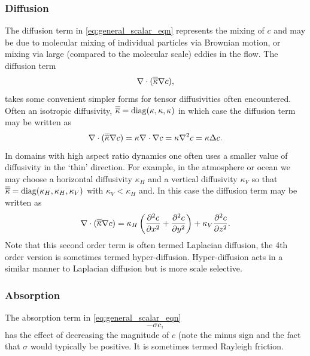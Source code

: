 \subsubsection{Diffusion}
The diffusion term in \eqref{eq:general_scalar_eqn} represents the mixing of $c$ and may be due to 
molecular mixing of individual particles via Brownian motion, or mixing via large (compared to the
molecular scale) eddies in the flow.
The diffusion term
\begin{equation}\label{eq:scalar_diffusion}
\nabla\cdot(\kaptens\nabla c),
\end{equation}
takes some convenient simpler forms for tensor diffusivities often encountered. Often an
isotropic diffusivity, $\kaptens = \mathrm{diag}(\kappa,\kappa,\kappa)$ in which case the diffusion term
may be written as
\begin{equation}\label{eq:scalar_isotropic_diffusion}
\nabla\cdot(\kaptens\nabla c) = \kappa\nabla\cdot\nabla c = \kappa\nabla^2 c = \kappa\Delta c.
\end{equation}
In domains with high aspect ratio dynamics one often uses a smaller value of diffusivity in the `thin'
direction. For example, in the atmosphere or ocean we may choose a horizontal diffusivity $\kappa_H$ and a
vertical diffusivity $\kappa_V$ so that
$\kaptens = \mathrm{diag}(\kappa_H,\kappa_H,\kappa_V)$ with $\kappa_V < \kappa_H$ and. 
In this case the diffusion term may be written as
\begin{equation}\label{eq:scalar_isotropic_diffusion}
\nabla\cdot(\kaptens\nabla c) = \kappa_H \left(\pptt[x]{c} + \pptt[y]{c}\right) + \kappa_V \pptt[z]{c}.
\end{equation}
Note that this second order term is often termed Laplacian diffusion, the 4th order version is sometimes
termed hyper-diffusion. Hyper-diffusion acts in a similar manner to Laplacian diffusion but is more
scale selective.

\subsubsection{Absorption}
The absorption term in \eqref{eq:general_scalar_eqn} 
\begin{equation}\label{eq:scalar_absorption}
-\sigma c,
\end{equation}
has the effect of decreasing the magnitude of $c$ (note the minus sign and the fact 
that $\sigma$ would typically be positive. It is sometimes termed Rayleigh friction. 

